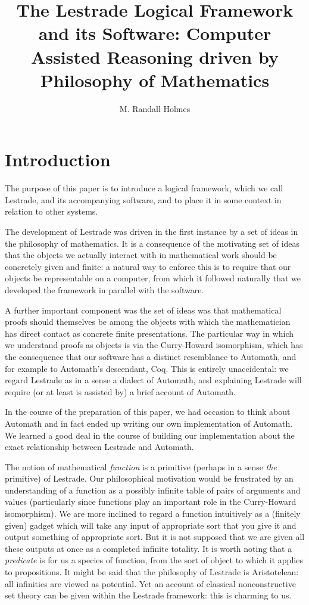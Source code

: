\documentclass[12pt]{article}
\title{The Lestrade Logical Framework and its Software:  Computer Assisted Reasoning driven by Philosophy of Mathematics}
\author{M. Randall Holmes}
\begin{document}
\maketitle

\section{Introduction}

The purpose of this paper is to introduce a logical framework, which we call Lestrade, and its accompanying software, and to place it in some context in relation to other systems.

The development of Lestrade was driven in the first instance by a set of ideas in the philosophy of mathematics.  It is a consequence of the motivating set of ideas that the objects we actually interact with in mathematical work should be concretely given and finite:  a natural way to enforce this is to require that our objects be representable on a computer, from which it followed naturally that we developed the framework in parallel with the software.

A further important component was the set of ideas was that mathematical proofs should themselves be among the objects with which the mathematician has direct contact as concrete finite presentations.  The particular way in which we understand proofs as objects is via the Curry-Howard isomorphism, which has the consequence that our software has a distinct resemblance to Automath, and for example to Automath's descendant, Coq.  This is entirely unaccidental:  we regard Lestrade as in a sense a dialect of Automath, and explaining Lestrade will require (or at least is assisted by) a brief account of Automath.

In the course of the preparation of this paper, we had occasion to think about Automath and in fact ended up writing our own implementation of Automath.   We learned a good deal in the course of building our implementation about the exact relationship between Lestrade and Automath.

The notion of mathematical {\em function\/} is a primitive (perhaps in a sense {\em the\/} primitive) of Lestrade.  Our philosophical motivation would be frustrated by an understanding of a function as a possibly infinite table of pairs of arguments and values (particularly since functions play an important role in the Curry-Howard isomorphism).  We are more inclined to regard a function intuitively as a (finitely given) gadget which will take any input of appropriate sort that you give it and output something of appropriate sort.  But it is not supposed that we are given all these outputs at once as a completed infinite totality.  It is worth noting that a {\em predicate\/} is for us a species of function, from the sort of object to which it applies to propositions.  It might be said that the philosophy of Lestrade is Aristotelean:  all infinities are viewed as potential.  Yet an account of classical nonconstructive set theory can be given within the Lestrade framework:  this is charming to us.
\end{document}
